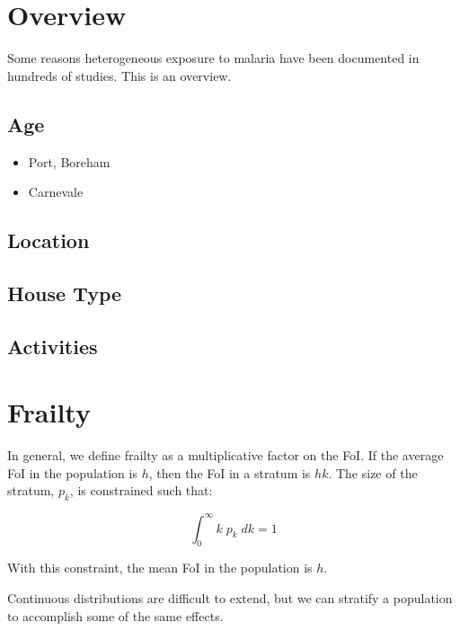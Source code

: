 \documentclass[
]{book}
\begin{document}
\hypertarget{overview}{%
\section{Overview}\label{overview}}

Some reasons heterogeneous exposure to malaria have been documented in hundreds of studies. This is an overview.

\hypertarget{age}{%
\subsection{Age}\label{age}}

\begin{itemize}
\item
  Port, Boreham
\item
  Carnevale
\end{itemize}

\hypertarget{location}{%
\subsection{Location}\label{location}}

\hypertarget{house-type}{%
\subsection{House Type}\label{house-type}}

\hypertarget{activities}{%
\subsection{Activities}\label{activities}}

\hypertarget{frailty}{%
\section{Frailty}\label{frailty}}

In general, we define frailty as a multiplicative factor on the FoI. If the average FoI in the population is \(h\), then the FoI in a stratum is \(hk\). The size of the stratum, \(p_k\), is constrained such that:

\[\int_0^\infty k \; p_k \; dk = 1\]

With this constraint, the mean FoI in the population is \(h\).

Continuous distributions are difficult to extend, but we can stratify a population to accomplish some of the same effects.
\end{document}
